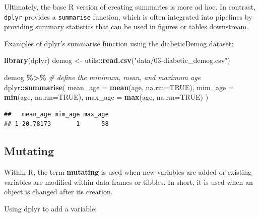 \documentclass[
]{book}
\newenvironment{Shaded}{\begin{snugshade}}{\end{snugshade}}
\newcommand{\AttributeTok}[1]{\textcolor[rgb]{0.13,0.29,0.53}{#1}}
\newcommand{\CommentTok}[1]{\textcolor[rgb]{0.56,0.35,0.01}{\textit{#1}}}
\newcommand{\ConstantTok}[1]{\textcolor[rgb]{0.56,0.35,0.01}{#1}}
\newcommand{\FunctionTok}[1]{\textcolor[rgb]{0.13,0.29,0.53}{\textbf{#1}}}
\newcommand{\NormalTok}[1]{#1}
\newcommand{\OtherTok}[1]{\textcolor[rgb]{0.56,0.35,0.01}{#1}}
\newcommand{\SpecialCharTok}[1]{\textcolor[rgb]{0.81,0.36,0.00}{\textbf{#1}}}
\newcommand{\StringTok}[1]{\textcolor[rgb]{0.31,0.60,0.02}{#1}}
\begin{document}
Ultimately, the base R version of creating summaries is more ad hoc. In contrast, \texttt{dplyr} provides a \texttt{summarise} function, which is often integrated into pipelines by providing summary statistics that can be used in figures or tables downstream.

Examples of dplyr's summarise function using the diabeticDemog dataset:

\begin{Shaded}
\begin{Highlighting}[]
\FunctionTok{library}\NormalTok{(dplyr)}
\NormalTok{demog }\OtherTok{\textless{}{-}}\NormalTok{ utils}\SpecialCharTok{::}\FunctionTok{read.csv}\NormalTok{(}\StringTok{"data/03{-}diabetic\_demog.csv"}\NormalTok{)}

\NormalTok{demog }\SpecialCharTok{\%\textgreater{}\%} 
    \CommentTok{\# define the minimum, mean, and maximum age}
\NormalTok{    dplyr}\SpecialCharTok{::}\FunctionTok{summarise}\NormalTok{(}
                \AttributeTok{mean\_age =} \FunctionTok{mean}\NormalTok{(age, }\AttributeTok{na.rm=}\ConstantTok{TRUE}\NormalTok{), }
                \AttributeTok{mim\_age =} \FunctionTok{min}\NormalTok{(age, }\AttributeTok{na.rm=}\ConstantTok{TRUE}\NormalTok{), }
                \AttributeTok{max\_age =} \FunctionTok{max}\NormalTok{(age, }\AttributeTok{na.rm=}\ConstantTok{TRUE}\NormalTok{)}
\NormalTok{            )}
\end{Highlighting}
\end{Shaded}

\begin{verbatim}
##   mean_age mim_age max_age
## 1 20.78173       1      58
\end{verbatim}

\subsection{Mutating}\label{sec:mutating}

Within R, the term \textbf{mutating} is used when new variables are added or existing variables are modified within data frames or tibbles. In short, it is used when an object is changed after its creation.

Using dplyr to add a variable:
\end{document}
